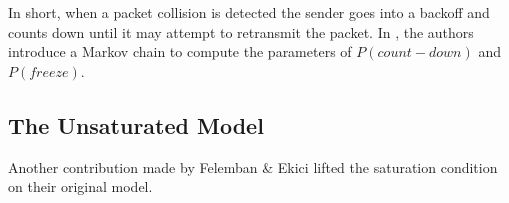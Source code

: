 In short, when a packet collision is detected the sender goes into a backoff and counts down until it may attempt to retransmit the packet. In \cite{felemban}, the authors introduce a Markov chain to compute the parameters of $P(count-down)$ and $P(freeze)$.

\subsection{The Unsaturated Model}

Another contribution made by Felemban \& Ekici lifted the saturation condition on their original model.
